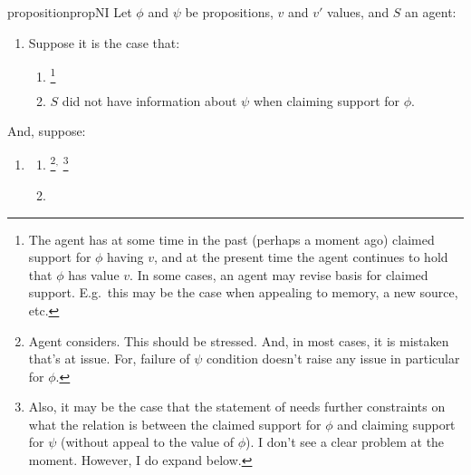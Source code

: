 \begin{note}[\nI{}]

  \begin{restatable}[\nI{-}  --- \nI{}]{proposition}{propNI}\label{prem:ni}
    Let \(\phi\) and \(\psi\) be propositions, \(v\) and \(v'\) values, and \(S\) an agent:
    \begin{enumerate}[ref=\named{\nIacro{}:\arabic*}, series=nI_counter]
    \item\label{nI:claimed-support}
      Suppose it is the case that:
      \begin{enumerate}[label=\alph*., ref=\named{\nIacro{}1:\alph*}]
      \item \nIClauseClaimedSupport{}\nolinebreak
        \footnote{
          The agent has at some time in the past (perhaps a moment ago) claimed support for \(\phi\) having \(v\), and at the present time the agent continues to hold that \(\phi\) has value \(v\).
          In some cases, an agent may revise basis for claimed support.
          E.g.\ this may be the case when appealing to memory, a new source, etc.
        }
      \item\label{nI:psi-is-new} {\color{red} \(S\) did not have information about \(\psi\) when claiming support for \(\phi\).}
      \end{enumerate}
    \end{enumerate}
    And, suppose:
    \begin{enumerate}[ref=\named{\nIacro{}:\arabic*}, resume*=nI_counter]
    \item\label{nI:inclusion} \nIClauseInclusion{}
      \begin{enumerate}[label=\alph*., ref=\named{\nIacro{}2:\alph*}]
      \item\label{nI:inclusion:position} \nIClauseInclusionPosition{}\nolinebreak
        \footnote{
          Agent considers.
          This should be stressed.
          And, in most cases, it is mistaken that's at issue.
          For, failure of \(\psi\) condition doesn't raise any issue in particular for \(\phi\).
        }\(^{,}\)\nolinebreak
        \footnote{
          Also, it may be the case that the statement of \nI{} needs further constraints on what the relation is between the claimed support for \(\phi\) and claiming support for \(\psi\) (without appeal to the value of \(\phi\)).
          I don't see a clear problem at the moment.
          However, I do expand below.
        }
      \item\label{nI:inclusion:bound} \nIClauseInclusioBound{}

\end{enumerate}
\end{enumerate}
\end{restatable}
\end{note}
